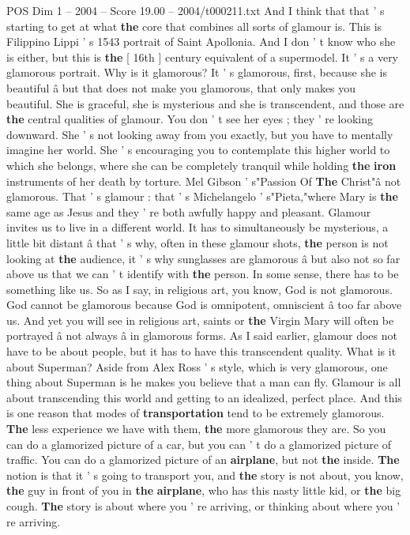 \begin{textsample}{POS Dim 1 – 2004 – Score 19.00 – 2004/t000211.txt}
And I think that that ' s starting to get at what \textbf{the} core that combines all sorts of glamour is.
This is Filippino Lippi ' s 1543 portrait of Saint Apollonia.
And I don ' t know who she is either, but this is \textbf{the} [ 16th ] century equivalent of a supermodel.
It ' s a very glamorous portrait.
Why is it glamorous?
It ' s glamorous, first, because she is beautiful â but that does not make you glamorous, that only makes you beautiful.
She is graceful, she is mysterious and she is transcendent, and those are \textbf{the} central qualities of glamour.
You don ' t see her eyes ; they ' re looking downward.
She ' s not looking away from you exactly, but you have to mentally imagine her world.
She ' s encouraging you to contemplate this higher world to which she belongs, where she can be completely tranquil while holding \textbf{the} \textbf{iron} instruments of her death by torture.
Mel Gibson ' s"Passion Of \textbf{The} Christ"â not glamorous.
That ' s glamour : that ' s Michelangelo ' s"Pieta,"where Mary is \textbf{the} same age as Jesus and they ' re both awfully happy and pleasant.
Glamour invites us to live in a different world.
It has to simultaneously be mysterious, a little bit distant â that ' s why, often in these glamour shots, \textbf{the} person is not looking at \textbf{the} audience, it ' s why sunglasses are glamorous â but also not so far above us that we can ' t identify with \textbf{the} person.
In some sense, there has to be something like us.
So as I say, in religious art, you know, God is not glamorous.
God cannot be glamorous because God is omnipotent, omniscient â too far above us.
And yet you will see in religious art, saints or \textbf{the} Virgin Mary will often be portrayed â not always â in glamorous forms.
As I said earlier, glamour does not have to be about people, but it has to have this transcendent quality.
What is it about Superman?
Aside from Alex Ross ' s style, which is very glamorous, one thing about Superman is he makes you believe that a man can fly.
Glamour is all about transcending this world and getting to an idealized, perfect place.
And this is one reason that modes of \textbf{transportation} tend to be extremely glamorous. \textbf{The} less experience we have with them, \textbf{the} more glamorous they are.
So you can do a glamorized picture of a car, but you can ' t do a glamorized picture of traffic.
You can do a glamorized picture of an \textbf{airplane}, but not \textbf{the} inside. \textbf{The} notion is that it ' s going to transport you, and \textbf{the} story is not about, you know, \textbf{the} guy in front of you in \textbf{the} \textbf{airplane}, who has this nasty little kid, or \textbf{the} big cough. \textbf{The} story is about where you ' re arriving, or thinking about where you ' re arriving.

\end{textsample}
